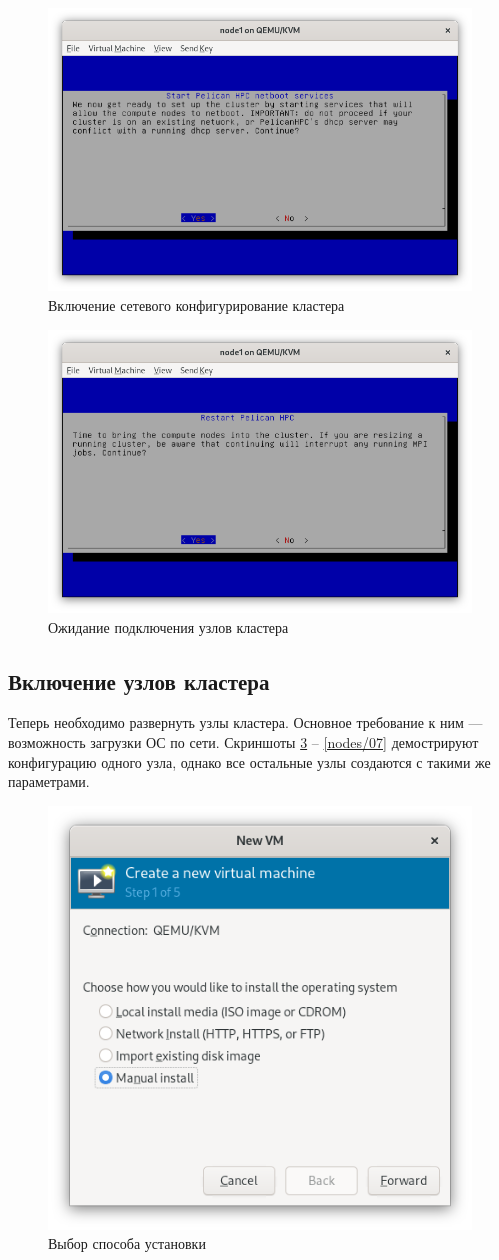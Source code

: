\begin{figure}[H]
	\centering
	\includegraphics[width=0.7\linewidth]{1-09}
	\caption{Включение сетевого конфигурирование кластера}
	\label{init/09}
\end{figure}

\begin{figure}[H]
	\centering
	\includegraphics[width=0.7\linewidth]{1-10}
	\caption{Ожидание подключения узлов кластера}
	\label{init/10}
\end{figure}


\subsection{Включение узлов кластера}

Теперь необходимо развернуть узлы кластера. Основное требование к ним --- возможность загрузки ОС по сети. Скриншоты \ref{nodes/01} -- \ref{nodes/07} демострируют конфигурацию одного узла, однако все остальные узлы создаются с такими же параметрами.

\begin{figure}[H]
	\centering
	\includegraphics[width=0.5\linewidth]{2-01}
	\caption{Выбор способа установки}
	\label{nodes/01}
\end{figure}

